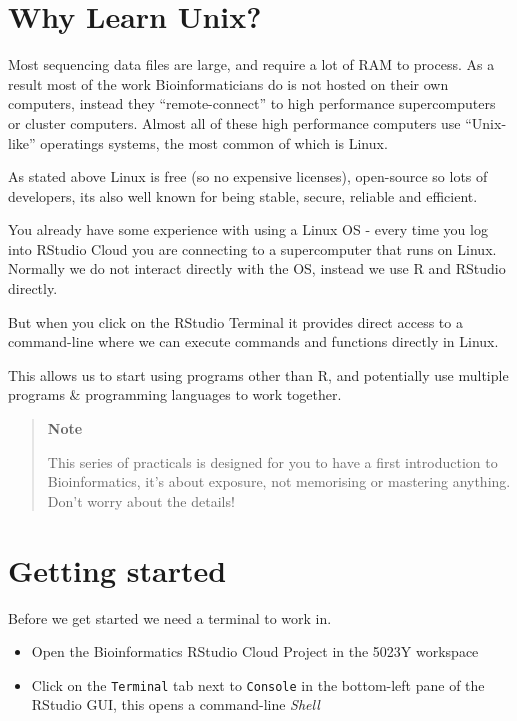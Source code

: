 \documentclass[
]{book}
\begin{document}
\hypertarget{why-learn-unix}{%
\section{Why Learn Unix?}\label{why-learn-unix}}

Most sequencing data files are large, and require a lot of RAM to process. As a result most of the work Bioinformaticians do is not hosted on their own computers, instead they ``remote-connect'' to high performance supercomputers or cluster computers. Almost all of these high performance computers use ``Unix-like'' operatings systems, the most common of which is Linux.

As stated above Linux is free (so no expensive licenses), open-source so lots of developers, its also well known for being stable, secure, reliable and efficient.

You already have some experience with using a Linux OS - every time you log into RStudio Cloud you are connecting to a supercomputer that runs on Linux. Normally we do not interact directly with the OS, instead we use R and RStudio directly.

But when you click on the RStudio Terminal it provides direct access to a command-line where we can execute commands and functions directly in Linux.

This allows us to start using programs other than R, and potentially use multiple programs \& programming languages to work together.

\begin{quote}
\textbf{Note}

This series of practicals is designed for you to have a first introduction to Bioinformatics, it's about exposure, not memorising or mastering anything. Don't worry about the details!
\end{quote}

\hypertarget{getting-started}{%
\section{Getting started}\label{getting-started}}

Before we get started we need a terminal to work in.

\begin{itemize}
\item
  Open the Bioinformatics RStudio Cloud Project in the 5023Y workspace
\item
  Click on the \texttt{Terminal} tab next to \texttt{Console} in the bottom-left pane of the RStudio GUI, this opens a command-line \emph{Shell}
\end{itemize}
\end{document}
